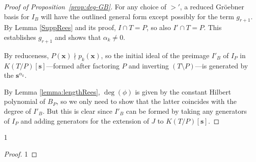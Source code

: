 \documentclass[fleqn,reqno]{amsart}
\numberwithin{first}{chapter}
\begin{document}
\begin{proof}[Proof of Proposition~\ref{prop:deg-GB}]
For any choice of $>'$, a reduced Gr\"oebner basis for $I_B$ will have the outlined general form
except possibly for the term $g_{r+1}$. By Lemma \ref{SuppRees} and its proof, $I\cap T=P$, so also
$I'\cap T=P$. This establishes $g_{r+1}$ and shows that $\alpha_k\neq0$.

By reduceness, $P(\mathbf x)\nmid p_k(\mathbf x)$, so the initial ideal of the preimage $I'_B$ of $I_P$
in $K(T/P)[\mathbf s]$---formed after factoring
$P$ and inverting $(T\setminus P)$---is generated by the $\mathbf s^{\alpha_k}$.

By Lemma \ref{lemma:lengthRees}, $\deg(\phi)$ is given by the constant Hilbert polynomial of $B_P$,
so we only need to show that the latter coincides with the degree of $I'_B$.
But this is clear since $I'_B$ can be formed by taking any generators of $I_P$
and adding generators for the extension of $J$ to $K(T/P)[\mathbf s]$.
%
%
%
\end{proof}



\begin{lemma}
\label{lemma:push-gens}
1
\end{lemma}

\begin{proof}1
\end{proof}





\end{document}
